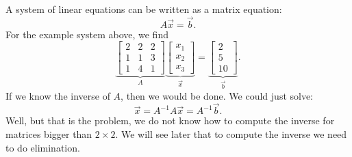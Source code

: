 A system of linear equations can be written as a matrix equation:
\begin{equation*}
A \vec{x} = \vec{b} .
\end{equation*}
For the example system above, we find
\begin{equation*}
\underbrace{
\begin{bmatrix}
2 & 2 & 2 \\
1 & 1 & 3 \\
1 & 4 & 1 
\end{bmatrix}
}_{A}
\underbrace{
\begin{bmatrix}
x_1 \\
x_2 \\
x_3
\end{bmatrix} 
}_{\vec{x}}
=
\underbrace{
\begin{bmatrix}
2 \\
5 \\
10
\end{bmatrix}
}_{\vec{b}} .
\end{equation*}
If we know the inverse of $A$, then we would be done.  We could
just solve:
\begin{equation*}
\vec{x} = A^{-1} A \vec{x} = A^{-1} \vec{b} .
\end{equation*}
Well, but that is the problem, we do not know how to compute the
inverse for matrices bigger than $2 \times 2$.
We will see later that to compute the inverse we need
to do elimination.

